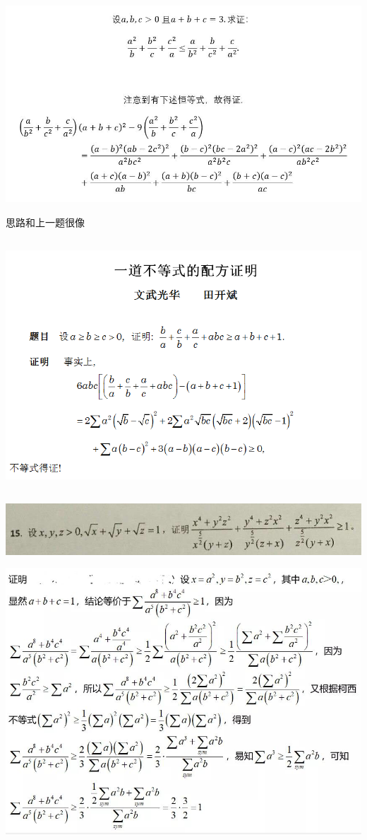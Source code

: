 \documentclass[UTF8]{ctexart}
\begin{document}
\subsection{}
\begin{center}
	\includegraphics[width=1\linewidth]{a19}
\end{center}
思路和上一题很像
\subsection{}
\begin{center}
	\includegraphics[width=0.8\linewidth]{a39}
\end{center}

\subsection{}
\begin{center}
	\includegraphics[width=0.5\linewidth]{a16}
\end{center}
\begin{center}
	\includegraphics[width=0.5\linewidth]{a17}
\end{center}
\end{document}
